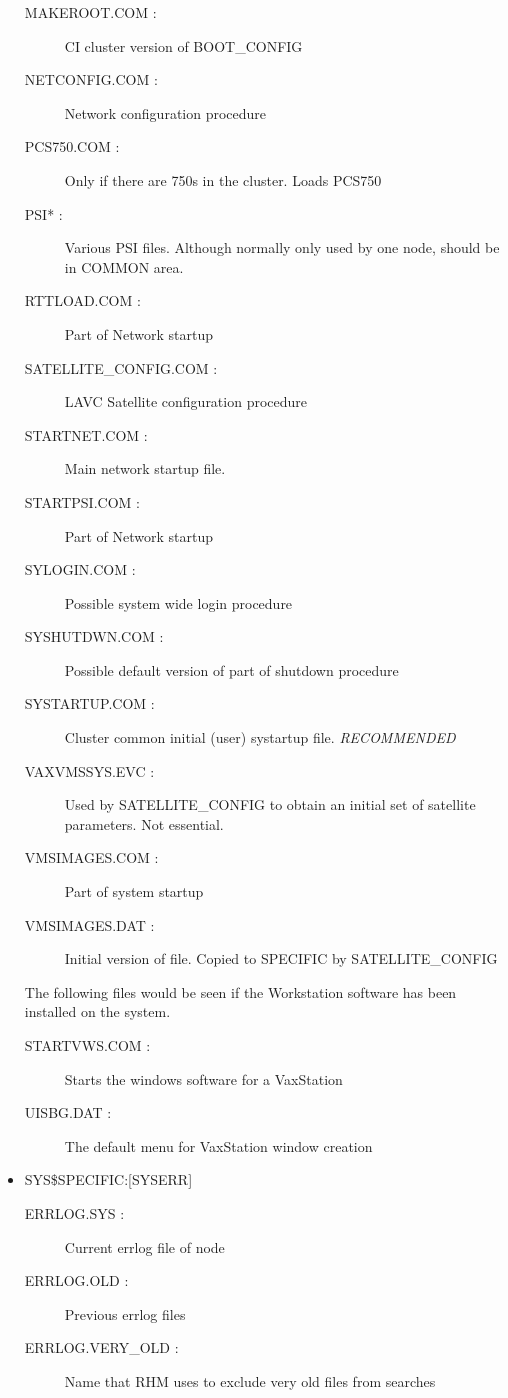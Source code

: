 \begin{itemize}
\begin{description}
\item [MAKEROOT.COM : ] CI cluster version of BOOT\_CONFIG
\item [NETCONFIG.COM : ] Network configuration procedure
\item [PCS750.COM : ] Only if there are 750s in the cluster. Loads PCS750
\item [PSI* : ] Various PSI files. Although normally only used by one node,
should be in COMMON area.
\item [RTTLOAD.COM : ] Part of Network startup
\item [SATELLITE\_CONFIG.COM : ] LAVC Satellite configuration procedure
\item [STARTNET.COM : ] Main network startup file.
\item [STARTPSI.COM : ] Part of Network startup
\item [SYLOGIN.COM : ] Possible system wide login procedure
\item [SYSHUTDWN.COM : ] Possible default version of part of shutdown procedure
\item [SYSTARTUP.COM : ] Cluster common initial (user) systartup file.
 {\em RECOMMENDED}
\item [VAXVMSSYS.EVC : ] Used by SATELLITE\_CONFIG to obtain an initial set of
satellite parameters. Not essential.
\item [VMSIMAGES.COM : ] Part of system startup
\item [VMSIMAGES.DAT : ] Initial version of file. Copied to SPECIFIC by 
SATELLITE\_CONFIG
\end{description}
The following files would be seen if the Workstation software has been
installed on the system.
\begin{description}
\item [STARTVWS.COM : ] Starts the windows software for a VaxStation
\item [UISBG.DAT : ] The default menu for VaxStation window creation
\end{description}
\item {SYS\$SPECIFIC:[SYSERR]}
\begin{description}
\item [ERRLOG.SYS : ] Current errlog file of node
\item [ERRLOG.OLD : ] Previous errlog files
\item [ERRLOG.VERY\_OLD : ] Name that RHM uses to exclude very old files from
searches
\end{description}


\end{itemize}
